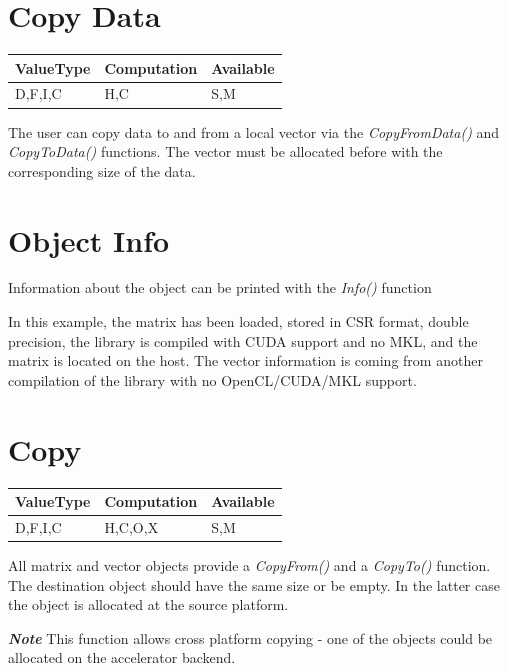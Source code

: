 \section{Copy Data}

\begin{table}[H]
\begin{tabular}{l|l|l}
\multicolumn{1}{c|}{ValueType} & Computation & Available \\ \hline
D,F,I,C                        & H,C          & S,M    
\end{tabular}
\end{table}

The user can copy data to and from a local vector via the \emph{CopyFromData()} and \emph{CopyToData()} functions. The vector must be allocated before with the corresponding size of the data. 


\section{Object Info}

Information about the object can be printed with the \emph{Info()} function


In this example, the matrix has been loaded, stored in CSR format, double precision, the library is compiled with CUDA support and no MKL, and the matrix is located on the host. The vector information is coming from another compilation of the library with no OpenCL/CUDA/MKL support.

\section{Copy}

\begin{table}[H]
\begin{tabular}{l|l|l}
\multicolumn{1}{c|}{ValueType} & Computation & Available \\ \hline
D,F,I,C                        & H,C,O,X     & S,M    
\end{tabular}
\end{table}


All matrix and vector objects provide a \emph{CopyFrom()} and a \emph{CopyTo()} function. The destination object should have the same size or be empty. In the latter case the object is allocated at the source platform.

\textbf{\emph{Note}} This function allows cross platform copying - one of the objects could be allocated on the accelerator backend.

